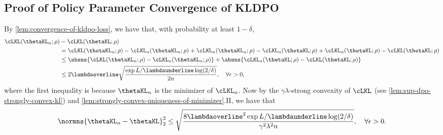 \subsection{Proof of Policy Parameter Convergence of KLDPO}\label{sec:proof-of-robust-policy-param-converg-kl}
By \cref{lem:convergence-of-kldpo-loss}, we have that, with probability at least $1-\delta$,
    \begin{align*}
        \cLKL(\thetaKL_n;\rho) &-\cLKL(\thetaKL;\rho) \\
        &= \cLKL(\thetaKL_n;\rho)-\cLKL_n(\thetaKL_n;\rho)+\cLKL_n(\thetaKL_n;\rho)-\cLKL_n(\thetaKL;\rho) +\cLKL_n(\thetaKL;\rho)-\cLKL(\thetaKL;\rho)\\
        &\leq \absns{\cLKL(\thetaKL_n;\rho)-\cLKL_n(\thetaKL_n;\rho)} + \absns{\cLKL_n(\thetaKL;\rho)-\cLKL(\thetaKL;\rho)} \\
        &\leq 2\lambdaoverline\sqrt{\frac{\exp{L/\lambdaunderline}\log(2/\delta)}{2n}}, \quad\forall\epsilon>0,
    \end{align*}
    where the first inequality is because $\thetaKL_n$ is the minimizer of $\cLKL_n$. Now by the $\gamma\lambda$-strong convexity of $\cLKL$ (see \cref{lem:sup-dpo-strongly-convex-kl}) and \cref{lem:strongly-convex-uniqueness-of-minimizer}.II, we have that
    \begin{equation*}
        \normns{\thetaKL_n -\thetaKL}_2^2 \leq \sqrt{\frac{8\lambdaoverline^2\exp{L/\lambdaunderline}\log(2/\delta)}{\gamma^2\lambda^2n}}, \quad\forall\epsilon >0.
    \end{equation*}


